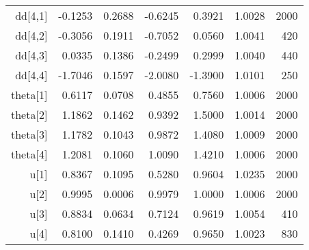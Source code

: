 \begin{table}[ht]
\begin{tabular}{rrrrrrr}
  dd[4,1] & -0.1253 & 0.2688 & -0.6245 & 0.3921 & 1.0028 &  2000 \\ 
  dd[4,2] & -0.3056 & 0.1911 & -0.7052 & 0.0560 & 1.0041 &   420 \\ 
  dd[4,3] & 0.0335 & 0.1386 & -0.2499 & 0.2999 & 1.0040 &   440 \\ 
  dd[4,4] & -1.7046 & 0.1597 & -2.0080 & -1.3900 & 1.0101 &   250 \\ 
  theta[1] & 0.6117 & 0.0708 & 0.4855 & 0.7560 & 1.0006 &  2000 \\ 
  theta[2] & 1.1862 & 0.1462 & 0.9392 & 1.5000 & 1.0014 &  2000 \\ 
  theta[3] & 1.1782 & 0.1043 & 0.9872 & 1.4080 & 1.0009 &  2000 \\ 
  theta[4] & 1.2081 & 0.1060 & 1.0090 & 1.4210 & 1.0006 &  2000 \\ 
  u[1] & 0.8367 & 0.1095 & 0.5280 & 0.9604 & 1.0235 &  2000 \\ 
  u[2] & 0.9995 & 0.0006 & 0.9979 & 1.0000 & 1.0006 &  2000 \\ 
  u[3] & 0.8834 & 0.0634 & 0.7124 & 0.9619 & 1.0054 &   410 \\ 
  u[4] & 0.8100 & 0.1410 & 0.4269 & 0.9650 & 1.0023 &   830 \\ 
   \hline
\end{tabular}
\end{table}
